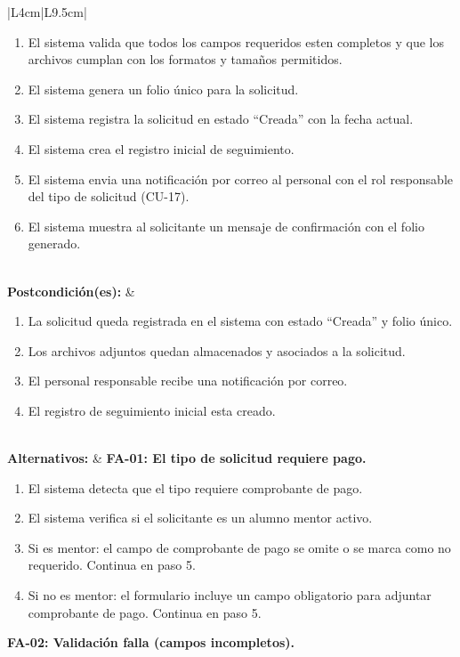 \begin{longtable}{|L{4cm}|L{9.5cm}|}
\begin{enumerate}[nosep, leftmargin=*]
        \item El sistema valida que todos los campos requeridos esten completos y que los archivos cumplan con los formatos y tamaños permitidos.
        \item El sistema genera un folio único para la solicitud.
        \item El sistema registra la solicitud en estado ``Creada'' con la fecha actual.
        \item El sistema crea el registro inicial de seguimiento.
        \item El sistema envia una notificación por correo al personal con el rol responsable del tipo de solicitud (CU-17).
        \item El sistema muestra al solicitante un mensaje de confirmación con el folio generado.
    \end{enumerate} \\
    \hline
    \textbf{Postcondición(es):} &
    \begin{enumerate}[nosep, leftmargin=*]
        \item La solicitud queda registrada en el sistema con estado ``Creada'' y folio único.
        \item Los archivos adjuntos quedan almacenados y asociados a la solicitud.
        \item El personal responsable recibe una notificación por correo.
        \item El registro de seguimiento inicial esta creado.
    \end{enumerate} \\
    \hline
    \textbf{Alternativos:} &
    \textbf{FA-01: El tipo de solicitud requiere pago.}
    \begin{enumerate}[nosep, leftmargin=*]
        \item[4.1] El sistema detecta que el tipo requiere comprobante de pago.
        \item[4.2] El sistema verifica si el solicitante es un alumno mentor activo.
        \item[4.3a] Si es mentor: el campo de comprobante de pago se omite o se marca como no requerido. Continua en paso 5.
        \item[4.3b] Si no es mentor: el formulario incluye un campo obligatorio para adjuntar comprobante de pago. Continua en paso 5.
    \end{enumerate}
    \vspace{0.2cm}
    \textbf{FA-02: Validación falla (campos incompletos).}
    \begin{enumerate}[nosep, leftmargin=*]

\end{enumerate}
\end{longtable}
